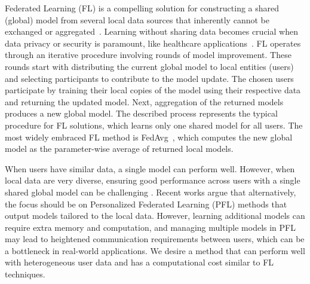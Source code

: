Federated Learning (FL) is a compelling solution for constructing a shared (global) model from several local data sources that inherently cannot be exchanged or aggregated~\citep{fed-learn, fed-learn-adv, fed-learn-survey, fed-learn-survey2, fed-learn-survey3, learnings-fl}.
Learning without sharing data becomes crucial when data privacy or security is paramount, like healthcare applications~\citep{fed-learn-app, fed-learn-health, fl-med-gan}. 
FL operates through an iterative procedure involving rounds of model improvement.
These rounds start with distributing the current global model to local entities (users) and selecting participants to contribute to the model update.
The chosen users participate by training their local copies of the model using their respective data and returning the updated model.
Next, aggregation of the returned models produces a new global model.
The described process represents the typical procedure for FL solutions, which learns only one shared model for all users.
The most widely embraced FL method is FedAvg~\citep{fedavg}, which computes the new global model as the parameter-wise average of returned local models.

When users have similar data, a single model can perform well.
However, when local data are very diverse, ensuring good performance across users with a single shared global model can be challenging \citep{single-model-problems, single-model-problems2}. 
Recent works \citep{pfl-bench, pfl} argue that alternatively, the focus should be on Personalized Federated Learning (PFL) methods that output models tailored to the local data.
However, learning additional models can require extra memory and computation, and managing multiple models in PFL may lead to heightened communication requirements between users, which can be a bottleneck in real-world applications.
We desire a method that can perform well with heterogeneous user data and has a computational cost similar to FL techniques.

